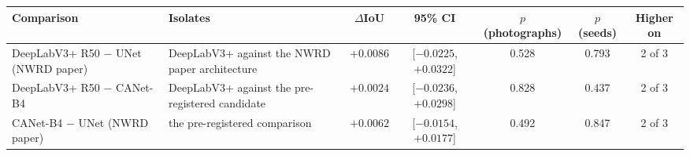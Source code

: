 \begin{tabular}{llccccc}
\toprule
Comparison & Isolates & $\Delta$IoU & 95\% CI & $p$ (photographs) & $p$ (seeds) & Higher on \\
\midrule
DeepLabV3+ R50 $-$ UNet (NWRD paper) & DeepLabV3+ against the NWRD paper architecture & $+0.0086$ & [$-0.0225$, $+0.0322$] & 0.528 & 0.793 & 2 of 3 \\
DeepLabV3+ R50 $-$ CANet-B4 & DeepLabV3+ against the pre-registered candidate & $+0.0024$ & [$-0.0236$, $+0.0298$] & 0.828 & 0.437 & 2 of 3 \\
CANet-B4 $-$ UNet (NWRD paper) & the pre-registered comparison & $+0.0062$ & [$-0.0154$, $+0.0177$] & 0.492 & 0.847 & 2 of 3 \\
\bottomrule
\end{tabular}
